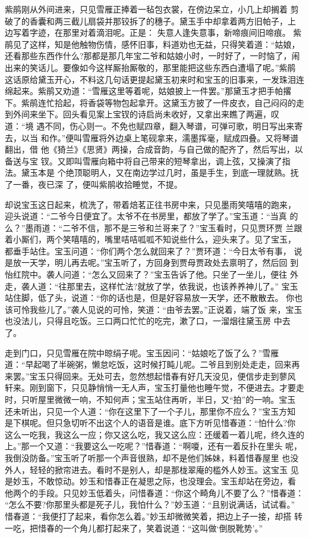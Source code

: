 紫鹃刚从外间进来，只见雪雁正捧着一毡包衣裳，在傍边呆立，小几上却搁着
剪破了的香囊和两三截儿扇袋并那铰拆了的穗子。黛玉手中却拿着两方旧帕子，上
边写着字迹，在那里对着滴泪呢。正是：
失意人逢失意事，新啼痕间旧啼痕。
紫鹃见了这样，知是他触物伤情，感怀旧事，料道劝也无益，只得笑着道：“姑娘，
还看那些东西作什么?那都是那几年宝二爷和姑娘小时，一时好了，一时恼了，闹
出来的笑话儿。要像如今这样厮抬厮敬的，那里能把这些东西白遭塌了呢。”紫鹃
这话原给黛玉开心，不料这几句话更提起黛玉初来时和宝玉的旧事来，一发珠泪连
绵起来。紫鹃又劝道：“雪雁这里等着呢，姑娘披上一件罢。”那黛玉才把手帕撂
下。紫鹃连忙拾起，将香袋等物包起拿开。这黛玉方披了一件皮衣，自己闷闷的走
到外间来坐下。回头看见案上宝钗的诗启尚未收好，又拿出来瞧了两遍，叹道：“境
遇不同，伤心则一。不免也赋四章，翻入琴谱，可弹可歌，明日写出来寄去，以当
和作。”便叫雪雁将外边桌上笔砚拿来，濡墨挥毫，赋成四叠。又将琴谱翻出，借
他《猗兰》《思贤》两操，合成音韵，与自己做的配齐了，然后写出，以备送与宝
钗。又即叫雪雁向箱中将自己带来的短琴拿出，调上弦，又操演了指法。黛玉本是
个绝顶聪明人，又在南边学过几时，虽是手生，到底一理就熟。抚了一番，夜已深
了，便叫紫鹃收拾睡觉，不提。

却说宝玉这日起来，梳洗了，带着焙茗正往书房中来，只见墨雨笑嘻嘻的跑来，
迎头说道：“二爷今日便宜了。太爷不在书房里，都放了学了。”宝玉道：“当真
的么？”墨雨道：“二爷不信，那不是三爷和兰哥来了？”宝玉看时，只见贾环贾
兰跟着小厮们，两个笑嘻嘻的，嘴里咭咭呱呱不知说些什么，迎头来了。见了宝玉，
都垂手站住。宝玉问道：“你们两个怎么就回来了？”贾环道：“今日太爷有事，
说是放一天学，明儿再去呢。”宝玉听了，方回身到贾母贾政处去禀明了，然后回
到怡红院中。袭人问道：“怎么又回来了？”宝玉告诉了他。只坐了一坐儿，便往
外走，袭人道：“往那里去，这样忙法?就放了学，依我说，也该养养神儿了。”
宝玉站住脚，低了头，说道：“你的话也是，但是好容易放一天学，还不散散去。
你也该可怜我些儿了。”袭人见说的可怜，笑道：“由爷去罢。”正说着，端了饭
来，宝玉也没法儿，只得且吃饭。三口两口忙忙的吃完，漱了口，一溜烟往黛玉房
中去了。

走到门口，只见雪雁在院中晾绢子呢。宝玉因问：“姑娘吃了饭了么？”雪雁
道：“早起喝了半碗粥，懒怠吃饭，这时候打盹儿呢。二爷且到别处走走，回来再
来罢。”宝玉只得回来。无处可去，忽然想起惜春有好几天没见，便信步走到蓼风
轩来。刚到窗下，只见静悄悄一无人声，宝玉打量他也睡午觉，不便进去。才要走
时，只听屋里微微一响，不知何声；宝玉站住再听，半日，又“拍”的一响。宝玉
还未听出，只见一个人道：“你在这里下了一个子儿，那里你不应么？”宝玉方知
是下棋呢。但只急切听不出这个人的语音是谁。底下方听见惜春道：“怕什么?你
这么一吃我，我这么一应；你又这么吃，我又这么应：还缓着一着儿呢，终久连的
上。”那一个又道：“我要这么一吃呢？”惜春道：“啊嗄，还有一着反扑在里头
呢，我倒没防备。”宝玉听了听那一个声音很熟，却不是他们姊妹，料着惜春屋里
也没外人，轻轻的掀帘进去。看时不是别人，却是那栊翠庵的槛外人妙玉。这宝玉
见是妙玉，不敢惊动。妙玉和惜春正在凝思之际，也没理会。宝玉却站在旁边，看
他两个的手段。只见妙玉低着头，问惜春道：“你这个畸角儿不要了么？”惜春道：
“怎么不要?你那里头都是死子儿，我怕什么？”妙玉道：“且别说满话，试试看。”
惜春道：“我便打了起来，看你怎么着。”妙玉却微微笑着，把边上子一接，却搭
转一吃，把惜春的一个角儿都打起来了，笑着说道：“这叫做‘倒脱靴势’。”


